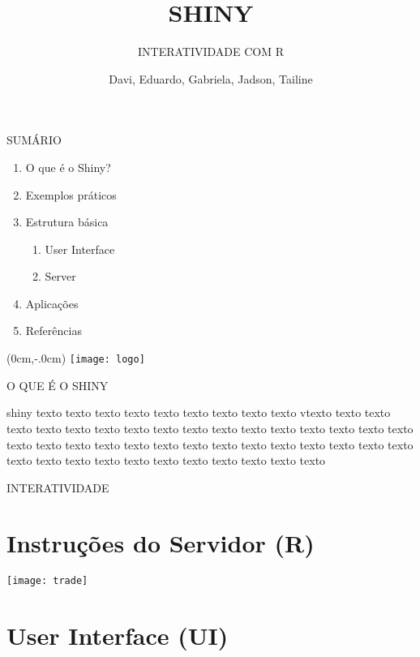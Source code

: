 \documentclass[
  ignorenonframetext,
]{beamer}
\title{SHINY}
\subtitle{INTERATIVIDADE COM R}
\author{Davi, Eduardo, Gabriela, Jadson, Tailine}
\date{}
\begin{document}
\frame{\titlepage}

\begin{frame}{SUMÁRIO}
\protect\hypertarget{sumario}{}

\begin{enumerate}
\item O que é o Shiny?
\item Exemplos práticos
\item Estrutura básica
\begin{enumerate}
\item User Interface
\item Server
\end{enumerate}
\item Aplicações
\item Referências
\end{enumerate}

\end{frame}

\begin{frame}{}
\protect\hypertarget{section}{}

\begin{textblock*}{0cm}(0cm,-.0cm)
\texttt{[image: logo]}
\end{textblock*}

\end{frame}

\begin{frame}{O QUE É O SHINY}
\protect\hypertarget{o-que-e-o-shiny}{}

shiny texto texto texto texto texto texto texto texto texto vtexto texto
texto texto texto texto texto texto texto texto texto texto texto texto
texto texto texto texto texto texto texto texto texto texto texto texto
texto texto texto texto texto texto texto texto texto texto texto texto
texto texto texto texto

\end{frame}

\begin{frame}{INTERATIVIDADE}
\protect\hypertarget{interatividade}{}

\section{Instruções do Servidor (R)}
\begin{center}
\texttt{[image: trade]}
\end{center}
\section{User Interface (UI)}

\end{frame}
\end{document}
